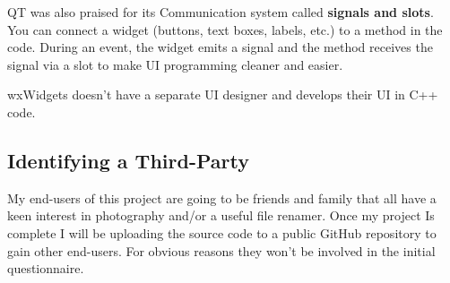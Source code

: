 \documentclass[11pt]{article}
\begin{document}
QT was also praised for its Communication system called \textbf{signals and slots}.
You can connect a widget (buttons, text boxes, labels, etc.) to a method in the code.
During an event, the widget emits a signal and the method receives the signal via a slot to make UI programming cleaner and easier.

wxWidgets doesn't have a separate UI designer and develops their UI in C++ code.




\subsection{Identifying a Third-Party}
My end-users of this project are going to be friends and family that all have a keen interest in photography and/or a useful file renamer.
Once my project Is complete I will be uploading the source code to a public GitHub repository to gain other end-users.
For obvious reasons they won't be involved in the initial questionnaire.
\end{document}
